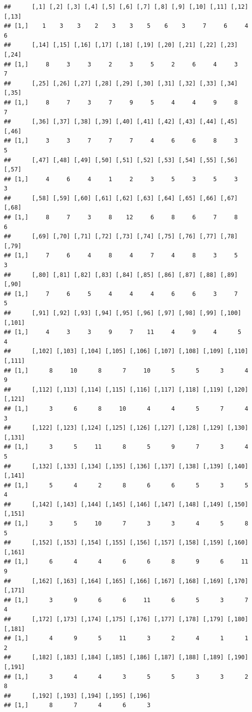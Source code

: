 \documentclass[]{book}
\theoremstyle{definition}
\theoremstyle{definition}
\theoremstyle{definition}
\theoremstyle{remark}
\begin{document}
\begin{verbatim}
##      [,1] [,2] [,3] [,4] [,5] [,6] [,7] [,8] [,9] [,10] [,11] [,12] [,13]
## [1,]    1    3    3    2    3    3    5    6    3     7     6     4     6
##      [,14] [,15] [,16] [,17] [,18] [,19] [,20] [,21] [,22] [,23] [,24]
## [1,]     8     3     3     2     3     5     2     6     4     3     7
##      [,25] [,26] [,27] [,28] [,29] [,30] [,31] [,32] [,33] [,34] [,35]
## [1,]     8     7     3     7     9     5     4     4     9     8     7
##      [,36] [,37] [,38] [,39] [,40] [,41] [,42] [,43] [,44] [,45] [,46]
## [1,]     3     3     7     7     7     4     6     6     8     3     5
##      [,47] [,48] [,49] [,50] [,51] [,52] [,53] [,54] [,55] [,56] [,57]
## [1,]     4     6     4     1     2     3     5     3     5     3     3
##      [,58] [,59] [,60] [,61] [,62] [,63] [,64] [,65] [,66] [,67] [,68]
## [1,]     8     7     3     8    12     6     8     6     7     8     6
##      [,69] [,70] [,71] [,72] [,73] [,74] [,75] [,76] [,77] [,78] [,79]
## [1,]     7     6     4     8     4     7     4     8     3     5     3
##      [,80] [,81] [,82] [,83] [,84] [,85] [,86] [,87] [,88] [,89] [,90]
## [1,]     7     6     5     4     4     4     6     6     3     7     5
##      [,91] [,92] [,93] [,94] [,95] [,96] [,97] [,98] [,99] [,100] [,101]
## [1,]     4     3     3     9     7    11     4     9     4      5      4
##      [,102] [,103] [,104] [,105] [,106] [,107] [,108] [,109] [,110] [,111]
## [1,]      8     10      8      7     10      5      5      3      4      9
##      [,112] [,113] [,114] [,115] [,116] [,117] [,118] [,119] [,120] [,121]
## [1,]      3      6      8     10      4      4      5      7      4      3
##      [,122] [,123] [,124] [,125] [,126] [,127] [,128] [,129] [,130] [,131]
## [1,]      3      5     11      8      5      9      7      3      4      5
##      [,132] [,133] [,134] [,135] [,136] [,137] [,138] [,139] [,140] [,141]
## [1,]      5      4      2      8      6      6      5      3      5      4
##      [,142] [,143] [,144] [,145] [,146] [,147] [,148] [,149] [,150] [,151]
## [1,]      3      5     10      7      3      3      4      5      8      5
##      [,152] [,153] [,154] [,155] [,156] [,157] [,158] [,159] [,160] [,161]
## [1,]      6      4      4      6      6      8      9      6     11      9
##      [,162] [,163] [,164] [,165] [,166] [,167] [,168] [,169] [,170] [,171]
## [1,]      3      9      6      6     11      6      5      3      7      4
##      [,172] [,173] [,174] [,175] [,176] [,177] [,178] [,179] [,180] [,181]
## [1,]      4      9      5     11      3      2      4      1      1      2
##      [,182] [,183] [,184] [,185] [,186] [,187] [,188] [,189] [,190] [,191]
## [1,]      3      4      4      3      5      5      3      3      2      8
##      [,192] [,193] [,194] [,195] [,196]
## [1,]      8      7      4      6      3
\end{verbatim}
\end{document}
